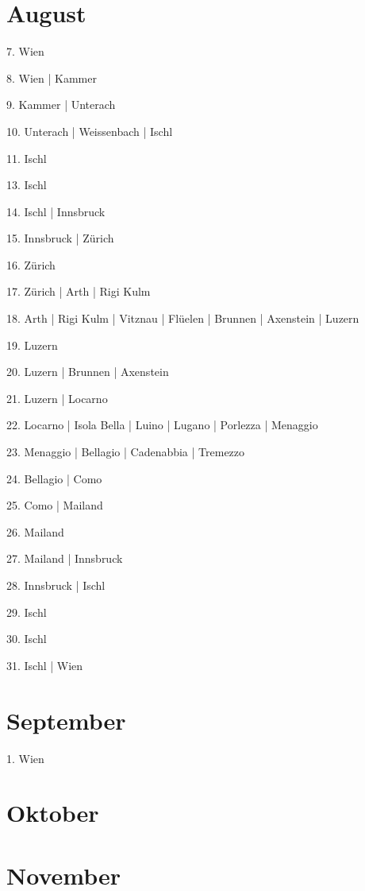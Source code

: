 \documentclass[twoside=false,titlepage=false,open=any, parskip=never, fontsize=10pt, headings=small, chapterprefix=false, appendixprefix=false, DIV=15]{scrbook}
\begin{document}
\begin{multicols}{3}
            \section*{August}
            7. Wien\par
            8. Wien | Kammer\par
            9. Kammer | Unterach\par
            10. Unterach | Weissenbach | Ischl\par
            11. Ischl\par
            13. Ischl\par
            14. Ischl | Innsbruck\par
            15. Innsbruck | Zürich\par
            16. Zürich\par
            17. Zürich | Arth | Rigi Kulm\par
            18. Arth | Rigi Kulm | Vitznau | Flüelen | Brunnen | Axenstein | Luzern\par
            19. Luzern\par
            20. Luzern | Brunnen | Axenstein\par
            21. Luzern | Locarno\par
            22. Locarno | Isola Bella | Luino | Lugano | Porlezza | Menaggio\par
            23. Menaggio | Bellagio | Cadenabbia | Tremezzo\par
            24. Bellagio | Como\par
            25. Como | Mailand\par
            26. Mailand\par
            27. Mailand | Innsbruck\par
            28. Innsbruck | Ischl\par
            29. Ischl\par
            30. Ischl\par
            31. Ischl | Wien\par
            \section*{September}
            1. Wien\par
            \section*{Oktober}
            \section*{November}

\end{multicols}
\end{document}
